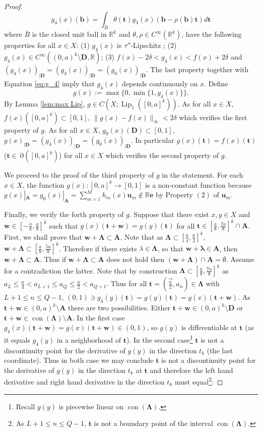 \documentclass[11pt]{article}
\theoremstyle{plain}
\theoremstyle{definition}
\DeclareMathOperator{\Lip}{Lip}
\DeclareMathOperator{\Edge}{\partial}
\DeclareMathOperator{\con}{con}
\def\R{\mathbb{R}}
\def\Rk{\mathbb{R}^k}
\def\tt{\mathbf t}
\def\ll{\mathbf \lambda}
\def\ww{\mathbf w}
\def\AA{\mathbf A}
\def\DD{\mathbf D}
\def\LL{\mathbf \Lambda}
\def\bb{\mathbf b}
\numberwithin{figure}{section}
\begin{document}
\begin{proof}
\begin{equation} \label{eq:g_4}
g_4(x)(\bb)=\int_{\overline{B}} \theta(\tt)g_3(x)(\bb-\rho(\bb)\tt) d\tt
\end{equation}
where $\overline{B}$ is the closed unit ball in $\Rk$ and $\theta, \rho\in C^\infty(\Rk)$, have the following properties for all $x\in X$: (1) $g_4(x)$ is $\tau''$-Lipschitz ; (2)   $g_4(x)\in C^\infty( (0,a)^k\setminus \DD, \R)$; (3) $f(x)-2\delta<g_4(x)< f(x)+2\delta$ and  $(g_4(x))_{|\DD}=(g_3(x))_{|\DD}=(g_0(x))_{|\DD}$. The last property together with Equation \eqref{eq:g_4} imply that  $g_4(x)$ depends continuously on $x$. Define $$g(x):=\max\{0,\min\{1,g_4(x)\}\}.$$
By Lemma \ref{lem:max Lip},   $g\in C(X;\Lip_1([0,a]^k))$. As for all $x\in X$, $f(x)([0,a]^k)\subset [0,1]$,   $\|g(x)-f(x)\|_\infty<2\delta$ which verifies the first property of $g$.
As for all $x\in X$, $g_0(x)(\DD)\subset [0,1]$, $g(x)_{|\DD}=(g_4(x))_{|\DD}=(g_0(x))_{|\DD}$. In particular  $g(x)(\tt)=f(x)(\tt)$ ($\tt\in\Edge([0,a]^k)$) for all $x\in X$ which verifies the second property of $g$.

We proceed to the proof of the third property of $g$ in the statement.
       For each $x\in X$, the function $g(x):[0,a]^k\to[0,1]$ is a non-constant function because $g(x)|_{\mathbf{A}}=g_0(x)|_{\mathbf{A}}=\sum\limits_{m=1}^{M}h_{m}(x)\mathbf u_m\notin\mathbb{R}\mathbf e$ by Property $(2)$ of $\mathbf u_m$. 
    
Finally, we verify the forth property of $g$.
Suppose that there exist $x,y\in X$ and $\mathbf w\in[-\frac{a}{8},\frac{a}{8}]^k$ such that $g(x)(\mathbf {t+w})=g(y)(\tt)$ for all $\tt\in[\frac{a}{8},\frac{7a}{8}]^k\cap \AA$. 
First, we shall prove that $\mathbf w+\LL\subset \mathbf{A}$. Note that as $\LL\subset [\frac{a}{4},\frac{a}{2}]^k$, $\ww+\LL\subset [\frac{a}{8},\frac{5a}{8}]^k$. Therefore if there exists $\lambda\in \LL$, so that $\ww+\ll\in \AA$, then $\ww+\LL\subset \AA$.   
Thus if $\mathbf w+\LL\subset \mathbf{A}$ does not hold then $(\mathbf w+\LL)\cap \mathbf{A}=\emptyset$. Assume for a contradiction the latter. Note that by construction $\LL\subset [\frac{a}{8},\frac{7a}{8}]^k$ as $a_L\leq \frac{a}{4}<a_{L+1}\leq a_Q\leq\frac{a}{2}<a_{Q+1}$. 
Thus for all $\mathbf t=(\vec{\frac{a}{2}}, a_n)\in\LL$ with $L+1\leq n\leq Q-1$, $(0,1)\ni g_4(y)(\tt)=g(y)(\tt)=g(x)(\tt+\mathbf {w})$. As $\mathbf {t+w}\in (0,a)^k\setminus\mathbf{A}$ there are two possibilities. Either $\mathbf {t+w}\in (0,a)^k\setminus\mathbf{D}$ or $\mathbf {t+w}\in \con(\LL)\setminus\mathbf{A}$. In the first case $g_4(x)(\tt+\mathbf {w})=g(x)(\tt+\mathbf {w})\in (0,1)$, so $g(y)$ is differentiable at $\mathbf t$ (as it equals $g_4(y)$ in a neighborhood of $\tt$). In the second case\footnote{Recall $g(y)$ is piecewise linear on $\con(\LL)$.} $\tt$ is not a discontinuity point for the derivative of $g(y)$ in the direction $t_k$ (the last coordinate). Thus in both case we may conclude  $\tt$ is not a discontinuity point for the derivative of $g(y)$ in the direction $t_k$  at  $\mathbf t$ and therefore the left hand derivative and right hand derivative in the direction $t_k$  must equal\footnote{As $L+1\leq n\leq Q-1$, $\tt$ is not a boundary point of the interval $\con(\LL)$.}:
    

\end{proof}
\end{document}
